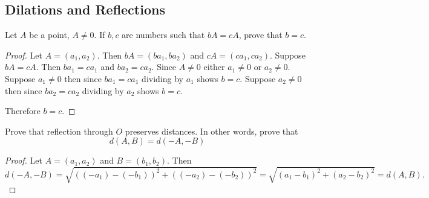 \subsection{Dilations and Reflections}

\begin{tcolorbox}[title=Problem 2, breakable]
    Let $A$ be a point, $A \ne 0$. If $b, c$ are numbers 
    such that $b A = c A$, prove that $b = c$.
\end{tcolorbox}

\begin{proof}
    Let $A = (a_1, a_2)$. Then $b A = (b a_1, b a_2)$
        and $c A = (c a_1, c a_2)$.
    Suppose $b A = c A$.
    Then $b a_1 = c a_1$ and $b a_2 = c a_2$.
    Since $A \ne 0$ either $a_1 \ne 0$ or $a_2 \ne 0$.
    Suppose $a_1 \ne 0$ then since $b a_1 = c a_1$
        dividing by $a_1$ shows $b = c$.
    Suppose $a_2 \ne 0$ then since $b a_2 = c a_2$
        dividing by $a_2$ shows $b = c$.

    Therefore $b = c$.
\end{proof}

\begin{tcolorbox}[title=Problem 3, breakable]
    Prove that reflection through $O$ preserves distances.
    In other words, prove that 
    \[d(A, B) = d(-A, -B)\]
\end{tcolorbox}

\begin{proof}
    Let $A = (a_1, a_2)$ and $B = (b_1, b_2)$. Then
    \[
    d(-A, -B) = \sqrt{((-a_1)-(-b_1))^2 + ((-a_2)-(-b_2))^2}
    = \sqrt{(a_1 - b_1)^2 + (a_2 - b_2)^2} = d(A, B).
    \]
\end{proof}

